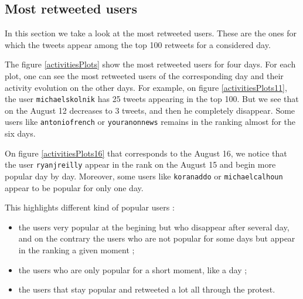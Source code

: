 \documentclass[a4paper,twoside,12pt,openright]{report}
\begin{document}
\newpage

\subsection{Most retweeted users}
In this section we take a look at the most retweeted users. These are the ones for which the tweets appear among the top 100 retweets for a considered day.

The figure \ref{activitiesPlots} show the most retweeted users for four days. For each plot, one can see the most retweeted users of the corresponding day and their activity evolution on the other days. For example, on figure \ref{activitiesPlots11}, the user \texttt{michaelskolnik} has 25 tweets appearing in the top 100. But we see that on the August 12 decreases to 3 tweets, and then he completely disappear. Some users like \texttt{antoniofrench} or \texttt{youranonnews} remains in the ranking almost for the six days.

On figure \ref{activitiesPlots16} that corresponds to the August 16, we notice that the user \texttt{ryanjreilly} appear in the rank on the August 15 and begin more popular day by day. Moreover, some users like \texttt{koranaddo} or \texttt{michaelcalhoun} appear to be popular for only one day.

This highlights different kind of popular users : 
\begin{itemize}
\item the users very popular at the begining but who disappear after several day, and on the contrary the users who are not popular for some days but appear in the ranking a given moment ;
\item the users who are only popular for a short moment, like a day ;
\item the users that stay popular and retweeted a lot all through the protest.
\end{itemize}
\end{document}
